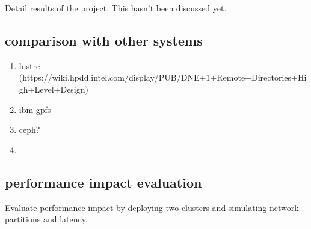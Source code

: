 Detail results of the project. This hasn't been discussed yet.

\subsection{comparison with other systems}
\begin{enumerate}
    \item lustre (https://wiki.hpdd.intel.com/display/PUB/DNE+1+Remote+Directories+High+Level+Design)
    \item ibm gpfs
    \item ceph?
    \item 
\end{enumerate}

\subsection{performance impact evaluation}
Evaluate performance impact by deploying two clusters and simulating network partitions and latency.
